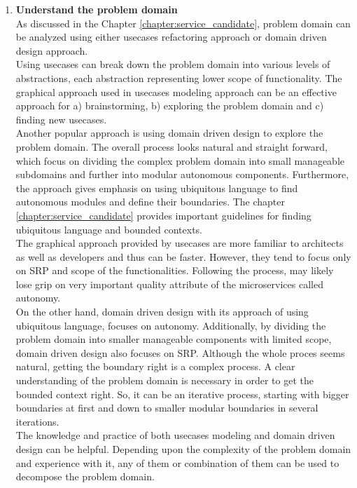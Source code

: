 \begin{enumerate}
\item \textbf{Understand the problem domain}\\
As discussed in the Chapter \ref{chapter:service_candidate}, problem domain can be analyzed using either usecases refactoring approach or domain driven design approach. \\
Using usecases can break down the problem domain into various levels of abstractions, each abstraction representing lower scope of functionality. The graphical approach used in usecases modeling approach can be an effective approach for a) brainstorming, b) exploring the problem domain and c) finding new usecases.\\
Another popular approach is using domain driven design to explore the problem domain. The overall process looks natural and straight forward, which focus on dividing the complex problem domain into small manageable subdomains and further into modular autonomous components. Furthermore, the approach gives emphasis on using ubiquitous language to find autonomous modules and define their boundaries. The chapter \ref{chapter:service_candidate} provides important guidelines for finding ubiquitous language and bounded contexts.\\
The graphical approach provided by usecases are more familiar to architects as well as developers and thus can be faster. However, they tend to focus only on \acrshort{SRP} and scope of the functionalities. Following the process, may likely lose grip on very important quality attribute of the microservices called autonomy.\\
On the other hand, domain driven design with its approach of using ubiquitous language, focuses on autonomy. Additionally, by dividing the problem domain into smaller manageable components with limited scope, domain driven design also focuses on \acrshort{SRP}. Although the whole proces seems natural, getting the boundary right is a complex process. A clear understanding of the problem domain is necessary in order to get the bounded context right. So, it can be an iterative process, starting with bigger boundaries at first and down to smaller modular boundaries in several iterations.\\
The knowledge and practice of both usecases modeling and domain driven design can be helpful. Depending upon the complexity of the problem domain and experience with it, any of them or combination of them can be used to decompose the problem domain.


\end{enumerate}
